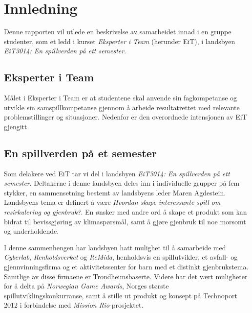 \section{Innledning}
Denne rapporten vil utlede en beskrivelse av samarbeidet innad i en gruppe studenter, som et ledd i kurset \emph{Eksperter i Team} (herunder EiT), i landsbyen \emph{EiT3014: En spillverden på ett semester}.

	\subsection{Eksperter i Team}
	Målet i Eksperter i Team er at studentene skal anvende sin fagkompetanse og utvikle sin samspillkompetanse gjennom å arbeide resultatrettet med relevante problemstillinger og situasjoner. Nedenfor er den overordnede intensjonen av EiT gjengitt.


	\subsection{En spillverden på et semester}
	Som delakere ved EiT tar vi del i landsbyen \emph{EiT3014: En spillverden på ett semester}. Deltakerne i denne landsbyen deles inn i individuelle grupper på fem stykker, en sammensetning bestemt av landsbyens leder Maren Agdestein. Landsbyens tema er definert å være \emph{Hvordan skape interessante spill om resirkulering og gjenbruk?}. En ønsker med andre ord å skape et produkt som kan bidrat til bevissgjøring av klimaspørsmål, samt å gjøre gjenbruk til noe morsomt og underholdende.

	I denne sammenhengen har landsbyen hatt mulighet til å samarbeide med \emph{Cyberlab}, \emph{Renholdsverket} og \emph{ReMida}, henholdsvis en spillutvikler, et avfall- og gjennvinningsfirma og et aktivitetssenter for barn med et distinkt gjenbrukstema. Samtlige av disse firmaene er Trondheimsbaserte. Videre har det vært muligheter for å delta på \emph{Norwegian Game Awards}, Norges største spillutviklingskonkurranse, samt å stille ut produkt og konsept på Technoport 2012 i forbindelse med \emph{Mission Rio}-prosjektet.


